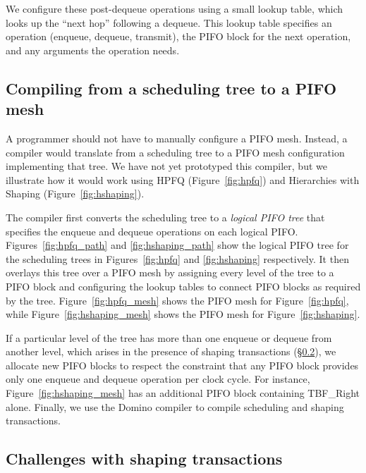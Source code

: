 We configure these post-dequeue operations using a small lookup table, which
looks up the ``next hop'' following a dequeue. This lookup table specifies an
operation (enqueue, dequeue, transmit), the PIFO block for the next operation,
and any arguments the operation needs.

\subsection{Compiling from a scheduling tree to a PIFO mesh}
\label{pifo_ss:compiler}

A programmer should not have to manually configure a PIFO mesh. Instead, a
compiler would translate from a scheduling tree to a PIFO mesh configuration
implementing that tree.  We have not yet prototyped this compiler, but we
illustrate how it would work using HPFQ (Figure~\ref{fig:hpfq}) and Hierarchies
with Shaping (Figure~\ref{fig:hshaping}).

The compiler first converts the scheduling tree to a {\em logical PIFO tree}
that specifies the enqueue and dequeue operations on each logical PIFO.
Figures~\ref{fig:hpfq_path} and \ref{fig:hshaping_path} show the logical PIFO
tree for the scheduling trees in Figures~\ref{fig:hpfq} and \ref{fig:hshaping}
respectively.  It then overlays this tree over a PIFO mesh by assigning every
level of the tree to a PIFO block and configuring the lookup tables to connect
PIFO blocks as required by the tree.  Figure~\ref{fig:hpfq_mesh} shows the PIFO
mesh for Figure~\ref{fig:hpfq}, while Figure~\ref{fig:hshaping_mesh} shows the
PIFO mesh for Figure~\ref{fig:hshaping}.

If a particular level of the tree has more than one enqueue or dequeue from
another level, which arises in the presence of shaping transactions
(\S\ref{ss:shape_challenge}), we allocate new PIFO blocks to respect the
constraint that any PIFO block provides only one enqueue and dequeue operation
per clock cycle. For instance, Figure~\ref{fig:hshaping_mesh} has an additional
PIFO block containing TBF\_Right alone. Finally, we use the Domino compiler to
compile scheduling and shaping transactions.

\subsection{Challenges with shaping transactions}
\label{ss:shape_challenge}

